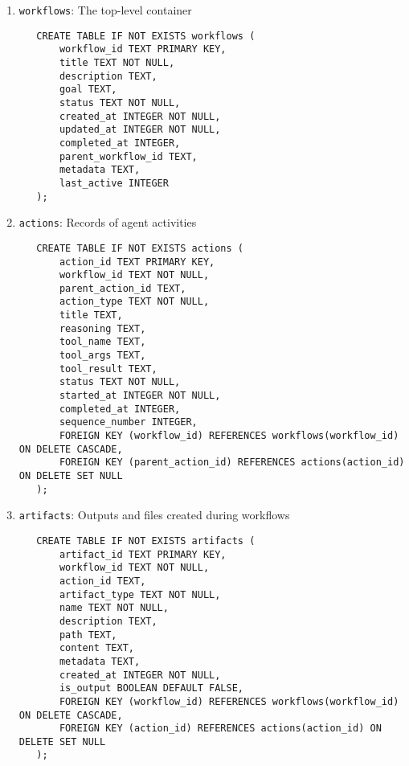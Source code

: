 \documentclass[12pt,a4paper]{article}
\newcommand{\code}[1]{\texttt{#1}}
\begin{document}
\begin{enumerate}[label=\arabic*.]
    \item \code{workflows}: The top-level container
    \begin{pageablecode}
    \begin{verbatim}
   CREATE TABLE IF NOT EXISTS workflows (
       workflow_id TEXT PRIMARY KEY,
       title TEXT NOT NULL,
       description TEXT,
       goal TEXT,
       status TEXT NOT NULL,
       created_at INTEGER NOT NULL,
       updated_at INTEGER NOT NULL,
       completed_at INTEGER,
       parent_workflow_id TEXT,
       metadata TEXT,
       last_active INTEGER
   );
    \end{verbatim}
    \end{pageablecode}

    \item \code{actions}: Records of agent activities
    \begin{pageablecode}
    \begin{verbatim}
   CREATE TABLE IF NOT EXISTS actions (
       action_id TEXT PRIMARY KEY,
       workflow_id TEXT NOT NULL,
       parent_action_id TEXT,
       action_type TEXT NOT NULL,
       title TEXT,
       reasoning TEXT,
       tool_name TEXT,
       tool_args TEXT,
       tool_result TEXT,
       status TEXT NOT NULL,
       started_at INTEGER NOT NULL,
       completed_at INTEGER,
       sequence_number INTEGER,
       FOREIGN KEY (workflow_id) REFERENCES workflows(workflow_id) ON DELETE CASCADE,
       FOREIGN KEY (parent_action_id) REFERENCES actions(action_id) ON DELETE SET NULL
   );
    \end{verbatim}
    \end{pageablecode}

    \item \code{artifacts}: Outputs and files created during workflows
    \begin{pageablecode}
    \begin{verbatim}
   CREATE TABLE IF NOT EXISTS artifacts (
       artifact_id TEXT PRIMARY KEY,
       workflow_id TEXT NOT NULL,
       action_id TEXT,
       artifact_type TEXT NOT NULL,
       name TEXT NOT NULL,
       description TEXT,
       path TEXT,
       content TEXT,
       metadata TEXT,
       created_at INTEGER NOT NULL,
       is_output BOOLEAN DEFAULT FALSE,
       FOREIGN KEY (workflow_id) REFERENCES workflows(workflow_id) ON DELETE CASCADE,
       FOREIGN KEY (action_id) REFERENCES actions(action_id) ON DELETE SET NULL
   );
    \end{verbatim}
    \end{pageablecode}


\end{enumerate}
\end{document}
